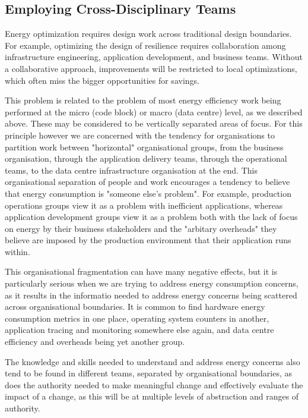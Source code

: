 \subsection{Employing Cross-Disciplinary Teams}

Energy optimization requires design work across traditional design boundaries. For example, optimizing the design of resilience requires collaboration among infrastructure engineering, application development, and business teams. Without a collaborative approach, improvements will be restricted to local optimizations, which often miss the bigger opportunities for savings.

This problem is related to the problem of most energy efficiency work being performed at the micro (code block) or macro (data centre) level, as we described above.  These may be considered to be vertically separated areas of focus.  For this principle however we are concerned with the tendency for organisations to partition work between "horizontal" organisational groups, from the business organisation, through the application delivery teams, through the operational teams, to the data centre infrastructure organisation at the end.  This organisational separation of people and work encourages a tendency to believe that energy consumption is "someone else's problem".  For example, production operations groups view it as a problem with inefficient applications, whereas application development groups view it as a problem both with the lack of focus on energy by their business stakeholders and the "arbitary overheads" they believe are imposed by the production environment that their application runs within.

This organisational fragmentation can have many negative effects, but it is particularly serious when we are trying to address energy consumption concerns, as it results in the informatio needed to address energy concerns being scattered across organisational boundaries.  It is common to find hardware energy consumption metrics in one place, operating system counters in another, application tracing and monitoring somewhere else again, and data centre efficiency and overheads being yet another group.

The knowledge and skills needed to understand and address energy concerns also tend to be found in different teams, separated by organisational boundaries, as does the authority needed to make meaningful change and effectively evaluate the impact of a change, as this will be at multiple levels of abstraction and ranges of authority.

